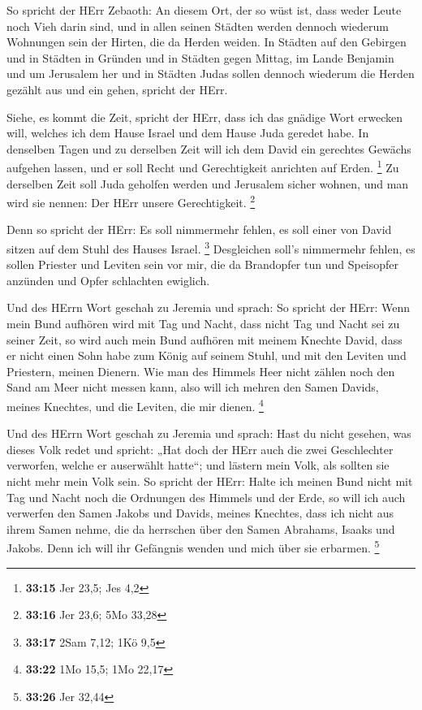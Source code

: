  So spricht der HErr Zebaoth: An diesem Ort, der so wüst
ist, dass weder Leute noch Vieh darin sind, und in allen seinen Städten
werden dennoch wiederum Wohnungen sein der Hirten, die da Herden weiden.
 In Städten auf den Gebirgen und in Städten in Gründen und
in Städten gegen Mittag, im Lande Benjamin und um Jerusalem her und in
Städten Judas sollen dennoch wiederum die Herden gezählt aus und ein
gehen, spricht der HErr.

 Siehe, es kommt die Zeit, spricht der HErr, dass ich das
gnädige Wort erwecken will, welches ich dem Hause Israel und dem Hause
Juda geredet habe.  In denselben Tagen und zu derselben
Zeit will ich dem David ein gerechtes Gewächs aufgehen lassen, und er
soll Recht und Gerechtigkeit anrichten auf Erden. \footnote{\textbf{33:15}
  Jer 23,5; Jes 4,2}  Zu derselben Zeit soll Juda geholfen
werden und Jerusalem sicher wohnen, und man wird sie nennen: Der HErr
unsere Gerechtigkeit. \footnote{\textbf{33:16} Jer 23,6; 5Mo 33,28}

 Denn so spricht der HErr: Es soll nimmermehr fehlen, es
soll einer von David sitzen auf dem Stuhl des Hauses Israel. \footnote{\textbf{33:17}
  2Sam 7,12; 1Kö 9,5}  Desgleichen soll's nimmermehr
fehlen, es sollen Priester und Leviten sein vor mir, die da Brandopfer
tun und Speisopfer anzünden und Opfer schlachten ewiglich.

 Und des HErrn Wort geschah zu Jeremia und sprach:
 So spricht der HErr: Wenn mein Bund aufhören wird mit Tag
und Nacht, dass nicht Tag und Nacht sei zu seiner Zeit,  so
wird auch mein Bund aufhören mit meinem Knechte David, dass er nicht
einen Sohn habe zum König auf seinem Stuhl, und mit den Leviten und
Priestern, meinen Dienern.  Wie man des Himmels Heer nicht
zählen noch den Sand am Meer nicht messen kann, also will ich mehren den
Samen Davids, meines Knechtes, und die Leviten, die mir dienen.
\footnote{\textbf{33:22} 1Mo 15,5; 1Mo 22,17}

 Und des HErrn Wort geschah zu Jeremia und sprach:
 Hast du nicht gesehen, was dieses Volk redet und spricht:
„Hat doch der HErr auch die zwei Geschlechter verworfen, welche er
auserwählt hatte``; und lästern mein Volk, als sollten sie nicht mehr
mein Volk sein.  So spricht der HErr: Halte ich meinen Bund
nicht mit Tag und Nacht noch die Ordnungen des Himmels und der Erde,
 so will ich auch verwerfen den Samen Jakobs und Davids,
meines Knechtes, dass ich nicht aus ihrem Samen nehme, die da herrschen
über den Samen Abrahams, Isaaks und Jakobs. Denn ich will ihr Gefängnis
wenden und mich über sie erbarmen. \footnote{\textbf{33:26} Jer 32,44}

